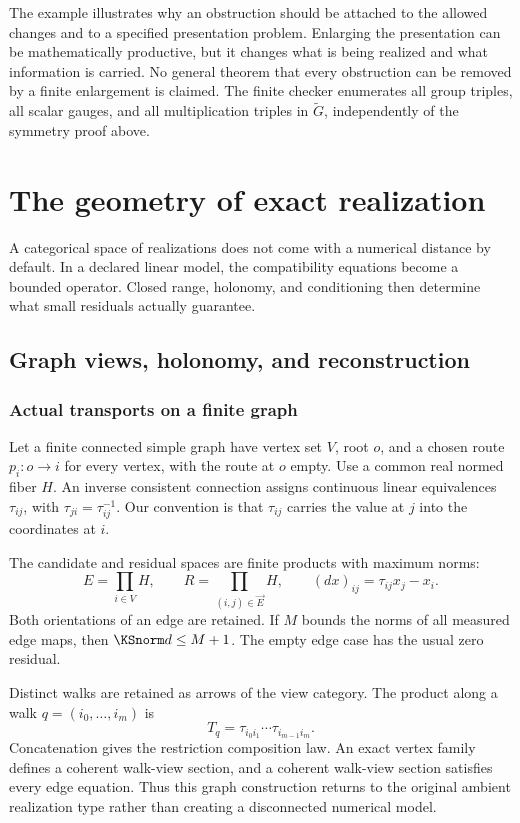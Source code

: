 The example illustrates why an obstruction should be attached to the allowed changes and to a specified presentation problem. Enlarging the presentation can be mathematically productive, but it changes what is being realized and what information is carried. No general theorem that every obstruction can be removed by a finite enlargement is claimed. The finite checker enumerates all group triples, all scalar gauges, and all multiplication triples in \(\widetilde G\), independently of the symmetry proof above.





\chapter{The geometry of exact realization}\label{KS:book:chapter-22}
A categorical space of realizations does not come with a numerical distance by default. In a declared linear model, the compatibility equations become a bounded operator. Closed range, holonomy, and conditioning then determine what small residuals actually guarantee.

\section{Graph views, holonomy, and reconstruction}\label{KS:sec:graph}
\subsection{Actual transports on a finite graph}
Let a finite connected simple graph have vertex set \(V\), root \(o\), and a chosen route \(p_i:o\to i\) for every vertex, with the route at \(o\) empty. Use a common real normed fiber \(H\). An inverse consistent connection assigns continuous linear equivalences \(\tau_{ij}\), with \(\tau_{ji}=\tau_{ij}^{-1}\). Our convention is that \(\tau_{ij}\) carries the value at \(j\) into the coordinates at \(i\).

The candidate and residual spaces are finite products with maximum norms:
\[
 E=\prod_{i\in V}H,\qquad
 R=\prod_{(i,j)\in\vec E}H,\qquad
 (dx)_{ij}=\tau_{ij}x_j-x_i.
\]
Both orientations of an edge are retained. If \(M\) bounds the norms of all measured edge maps, then \(\KSnorm d\le M+1\). The empty edge case has the usual zero residual.

Distinct walks are retained as arrows of the view category. The product along a walk \(q=(i_0,\ldots,i_m)\) is
\[
 T_q=\tau_{i_0i_1}\cdots\tau_{i_{m-1}i_m}.
\]
Concatenation gives the restriction composition law. An exact vertex family defines a coherent walk-view section, and a coherent walk-view section satisfies every edge equation. Thus this graph construction returns to the original ambient realization type rather than creating a disconnected numerical model.

